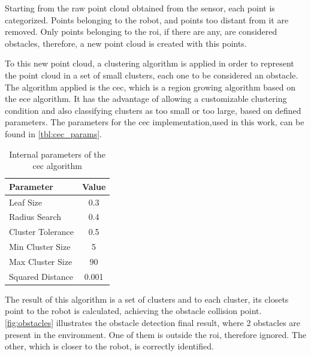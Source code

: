 \par Starting from the raw point cloud obtained from the sensor, each point is categorized. Points belonging to the robot, and points too distant from it are removed. Only points belonging to the \ac{roi}, if there are any, are considered obstacles, therefore, a new point cloud is created with this points.
\par To this new point cloud, a clustering algorithm is applied in order to represent the point cloud in a set of small clusters, each one to be considered an obstacle. The algorithm applied is the \ac{cec}, which is a region growing algorithm based on the \ac{ece} algorithm. It has the advantage of allowing a customizable clustering condition and also classifying clusters as too small or too large, based on defined parameters. The parameters for the \ac{cec} implementation,used in this work, can be found in \autoref{tbl:cec_params}.

\begin{table}[h]
    \centering
    \begin{tabular}{|l|c|}
    \hline
    \textbf{Parameter} & \textbf{Value} \\ \hline
    Leaf Size & 0.3 \\ \hline
    Radius Search & 0.4 \\ \hline
    Cluster Tolerance & 0.5 \\ \hline
    Min Cluster Size & 5 \\ \hline
    Max Cluster Size & 90 \\ \hline
    Squared Distance & 0.001 \\ \hline
    \end{tabular}
    \caption{Internal parameters of the \ac{cec} algorithm}
    \label{tbl:cec_params}
\end{table}

\par The result of this algorithm is a set of clusters and to each cluster, its closets point to the robot is calculated, achieving the obstacle collision point. \autoref{fig:obstacles} illustrates the obstacle detection final result, where 2 obstacles are present in the environment. One of them is outside the \ac{roi}, therefore ignored. The other, which is closer to the robot, is correctly identified.

